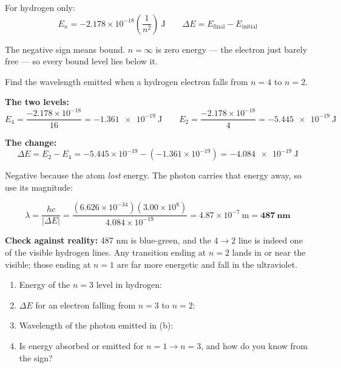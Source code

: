 \documentclass{apchem-worksheet}
\begin{document}
For hydrogen only:
\[ E_n = -2.178\times10^{-18}\left(\frac{1}{n^{2}}\right)~\text{J}
   \qquad
   \Delta E = E_{\text{final}} - E_{\text{initial}} \]

The negative sign means bound. $n = \infty$ is zero energy --- the
electron just barely free --- so every bound level lies below it.

\begin{workedexample}
Find the wavelength emitted when a hydrogen electron falls from
$n = 4$ to $n = 2$.

\textbf{The two levels:}
\[ E_4 = \frac{-2.178\times10^{-18}}{16} = \SI{-1.361e-19}{\joule}
   \qquad
   E_2 = \frac{-2.178\times10^{-18}}{4} = \SI{-5.445e-19}{\joule} \]

\textbf{The change:}
\[ \Delta E = E_2 - E_4 = -5.445\times10^{-19} - (-1.361\times10^{-19})
   = \SI{-4.084e-19}{\joule} \]

Negative because the atom \emph{lost} energy. The photon carries that
energy away, so use its magnitude:

\[ \lambda = \frac{hc}{|\Delta E|}
   = \frac{(6.626\times10^{-34})(3.00\times10^{8})}{4.084\times10^{-19}}
   = 4.87\times10^{-7}~\text{m} = \mathbf{487~nm} \]

\textbf{Check against reality:} 487 nm is blue-green, and the
$4 \to 2$ line is indeed one of the visible hydrogen lines. Any
transition ending at $n = 2$ lands in or near the visible; those ending
at $n = 1$ are far more energetic and fall in the ultraviolet.
\end{workedexample}

\begin{yourturn}
\begin{enumerate}[leftmargin=*,itemsep=0.5em]
  \item Energy of the $n = 3$ level in hydrogen: \workspace[1.4cm]
  \item $\Delta E$ for an electron falling from $n = 3$ to $n = 2$:
        \workspace[1.6cm]
  \item Wavelength of the photon emitted in (b): \workspace[1.8cm]
  \item Is energy absorbed or emitted for $n = 1 \to n = 3$, and how do
        you know from the sign? \workspace[1.6cm]
\end{enumerate}
\end{yourturn}
\end{document}
